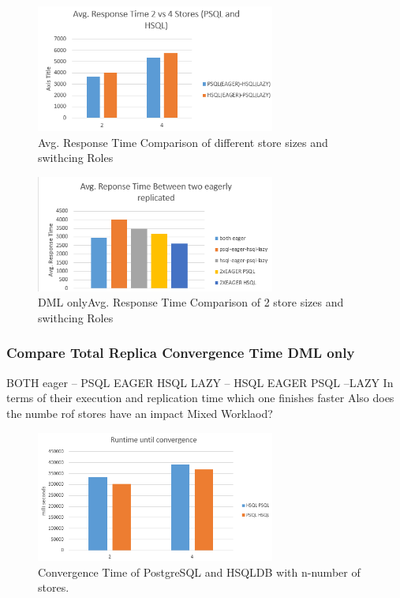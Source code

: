 \begin{figure}[t] 
    \centering 
    \includegraphics[width=0.7\textwidth]{Figures/24_avg_psql_hsql_switched_lazy.PNG}
    \caption{Avg. Response Time Comparison of different store sizes and swithcing Roles}
    \label{fig:}
\end{figure}



\begin{figure}[t] 
    \centering 
    \includegraphics[width=0.7\textwidth]{Figures/psq_hsql_avg.response2.PNG}
    \caption{DML onlyAvg. Response Time Comparison of 2 store sizes and swithcing Roles}
    \label{fig:}
\end{figure}







\subsubsection{Compare Total Replica Convergence Time DML only } 

BOTH eager  -- PSQL EAGER HSQL LAZY -- HSQL EAGER PSQL --LAZY
In terms of their execution and replication time which one finishes faster
Also does the numbe rof stores have an impact
Mixed Worklaod?

\begin{figure}[t] 
    \centering 
    \includegraphics[width=0.7\textwidth]{Figures/runtime_convergence24.PNG}
    \caption{Convergence Time of PostgreSQL and HSQLDB with n-number of stores.}
    \label{fig:store_comparision}
\end{figure}


